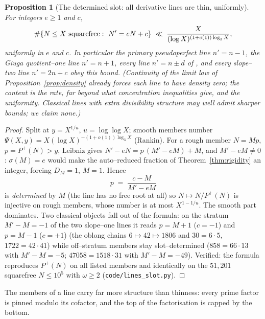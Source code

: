 \documentclass[11pt]{article}
\newtheorem{proposition}[theorem]{Proposition}
\theoremstyle{definition}
\begin{document}
\begin{proposition}[The determined slot: all derivative lines are thin, uniformly]\label{prop:lines}
For integers $e\ge1$ and $c$,
\[ \#\{N\le X\ \textnormal{squarefree}:\ N'=eN+c\}\;\ll\;\frac{X}{(\log X)^{(1+o(1))\log_3X}}, \]
uniformly in $e$ and $c$. In particular the primary pseudoperfect line $n'=n-1$, the Giuga
quotient--one line $n'=n+1$, every line $n'=n\pm d$ of
\cite{GrauOllerMarcenSadornil2021}, and every slope--two line $n'=2n+c$ obey this bound.
(Continuity of the limit law of Proposition~\ref{prop:density} already forces each line to have
density zero; the content is the rate, far beyond what concentration inequalities give, and the
uniformity. Classical lines with extra divisibility structure may well admit sharper bounds; we
claim none.)
\end{proposition}
\begin{proof}
Split at $y=X^{1/u}$, $u=\log\log X$; smooth members number
$\Psi(X,y)=X(\log X)^{-(1+o(1))\log_3X}$ (Rankin). For a rough member $N=Mp$, $p=P^+(N)>y$,
Leibniz gives $N'-eN=p\,(M'-eM)+M$, and $M'-eM\ne0$: $\sigma(M)=e$ would make the auto--reduced
fraction of Theorem~\ref{thm:rigidity} an integer, forcing $D_M=1$, $M=1$. Hence
\[ p\;=\;\frac{c-M}{M'-eM} \]
is \emph{determined} by $M$ (the line has no free root at all) so $N\mapsto N/P^+(N)$ is
injective on rough members, whose number is at most $X^{1-1/u}$. The smooth part dominates.
Two classical objects fall out of the formula: on the stratum $M'-M=-1$ of the two slope--one
lines it reads $p=M+1$ ($c=-1$) and $p=M-1$ ($c=+1$) (the oblong chains
$6\mapsto42\mapsto1806$ and $30=6\cdot5$, $1722=42\cdot41$) while off--stratum members stay
slot--determined ($858=66\cdot13$ with $M'-M=-5$; $47058=1518\cdot31$ with $M'-M=-49$). Verified:
the formula reproduces $P^+(N)$ on all listed members and identically on the $51{,}201$ squarefree
$N\le10^5$ with $\omega\ge2$ (\texttt{code/lines\_slot.py}).
\end{proof}

The members of a line carry far more structure than thinness: every prime factor is pinned modulo
its cofactor, and the top of the factorisation is capped by the bottom.
\end{document}
